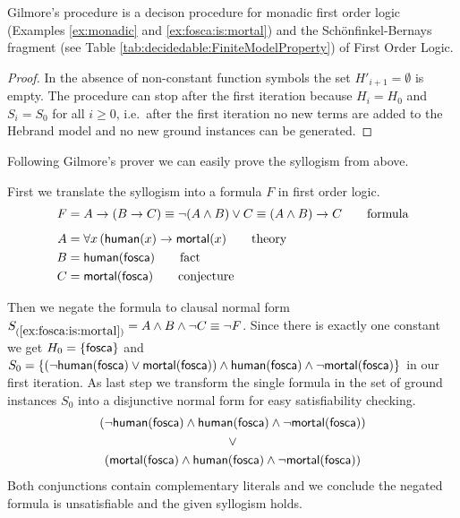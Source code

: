 \begin{lemma}
	Gilmore's procedure is a decison procedure for monadic first order logic 
	(Examples \ref{ex:monadic}  and \ref{ex:fosca:is:mortal})
	and the Schönfinkel-Bernays fragment (see Table \ref{tab:decidedable:FiniteModelProperty}) 
	of First Order Logic. 
\end{lemma}

\begin{proof}
	In the absence of non-constant function symbols the set $H'_{i+1} = \emptyset$ is empty.
	The procedure can stop after the first iteration because 
	$H_i = H_0$ and $S_i = S_0$ for all $i\geq0$,
	i.e.~after the first iteration 
	no new terms are added to the Hebrand model 
	and no new ground instances can be generated.
\end{proof}

Following Gilmore's prover we can easily prove the syllogism from above.

\begin{example}\label{ex:fosca:is:mortal}
	First we translate the syllogism into a formula $F$ in first order logic.
	\begin{align*}
	F &= A \rightarrow (B \rightarrow C) \equiv \lnot(A\land B) \lor C \equiv (A\land B)\rightarrow C  
	\tag*{formula}
	\\[0.5em]
	A &= \forall x\, ( \mathsf{human}(x) \rightarrow \mathsf{mortal}(x) 
	\tag*{theory}
	\\
	B &= \mathsf{human}(\mathsf{fosca}) 
	\tag*{fact}
	\\
	C &= \mathsf{mortal}(\mathsf{fosca})
	\tag*{conjecture}
	\end{align*}
	
	
	
	Then we negate the formula to clausal normal form $S_{(\ref{ex:fosca:is:mortal})} = A\land B \land\lnot C \equiv \lnot F$.
	Since there is exactly one constant we get
	$H_0 = \{ \mathsf{fosca} \}$ and 
	$S_0 = 
	\{
	(\lnot\mathsf{human}(\mathsf{fosca})\lor\mathsf{mortal}(\mathsf{fosca}))\land\mathsf{human}(\mathsf{fosca})\land\lnot\mathsf{mortal}(\mathsf{fosca})
	\}$ in our first iteration. 
	As last step we transform the single formula in 
	the set of ground instances $S_0$ into a disjunctive normal form 
	for easy satisfiability checking.
	\begin{gather*}
	(\lnot\mathsf{human}(\mathsf{fosca})\land\mathsf{human}(\mathsf{fosca})\land\lnot\mathsf{mortal}(\mathsf{fosca}))
	\\ 
	\lor
	\\ 
	(\mathsf{mortal}(\mathsf{fosca})\land\mathsf{human}(\mathsf{fosca})\land\lnot\mathsf{mortal}(\mathsf{fosca}))
	\end{gather*}
	Both conjunctions contain complementary literals and we conclude the negated formula is unsatisfiable
	and the given syllogism holds.
	
\end{example}

